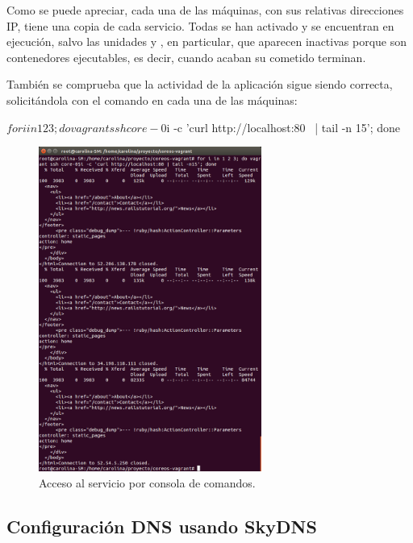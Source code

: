 Como se puede apreciar, cada una de las máquinas, con sus relativas direcciones IP, tiene una copia de cada servicio. Todas se han activado y se encuentran en ejecución, salvo las unidades  y , en particular, que aparecen inactivas porque son contenedores ejecutables, es decir, cuando acaban su cometido terminan.

También se comprueba que la actividad de la aplicación sigue siendo correcta, solicitándola con el comando  en cada una de las máquinas:

\begin{code}
$ for i in 1 2 3; do vagrant ssh core-0$i -c 'curl http://localhost:80 \
  | tail -n 15'; done
\end{code}

\begin{figure}[H]
\centering
\includegraphics[width=0.65\textwidth]{images/figures/curl-fleet.png}
\caption{Acceso al servicio por consola de comandos.}
\end{figure}

\subsection{Configuración DNS usando SkyDNS}

